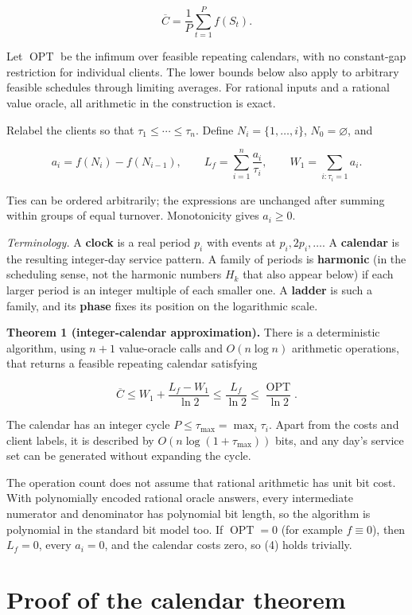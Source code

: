 \documentclass[
  british,
  11pt,
  a4paper,
]{article}
\begin{document}
\[
\overline C=\frac1P\sum_{t=1}^P f(S_t).
\]

Let \(\operatorname{OPT}\) be the infimum over feasible repeating
calendars, with no constant-gap restriction for individual clients. The
lower bounds below also apply to arbitrary feasible schedules through
limiting averages. For rational inputs and a rational value oracle, all
arithmetic in the construction is exact.

Relabel the clients so that \(\tau_1\le\cdots\le\tau_n\). Define
\(N_i=\{1,\ldots,i\}\), \(N_0=\varnothing\), and

\[
a_i=f(N_i)-f(N_{i-1}),\qquad
L_f=\sum_{i=1}^n\frac{a_i}{\tau_i},\qquad
W_1=\sum_{i:\tau_i=1}a_i. \tag{3}
\]

Ties can be ordered arbitrarily; the expressions are unchanged after
summing within groups of equal turnover. Monotonicity gives \(a_i\ge0\).

\emph{Terminology.} A \textbf{clock} is a real period \(p_i\) with
events at \(p_i,2p_i,\ldots\). A \textbf{calendar} is the resulting
integer-day service pattern. A family of periods is \textbf{harmonic}
(in the scheduling sense, not the harmonic numbers \(H_k\) that also
appear below) if each larger period is an integer multiple of each
smaller one. A \textbf{ladder} is such a family, and its \textbf{phase}
fixes its position on the logarithmic scale.

\textbf{Theorem 1 (integer-calendar approximation).} There is a
deterministic algorithm, using \(n+1\) value-oracle calls and
\(O(n\log n)\) arithmetic operations, that returns a feasible repeating
calendar satisfying

\[
\overline C\le W_1+\frac{L_f-W_1}{\ln2}
\le\frac{L_f}{\ln2}
\le\frac{\operatorname{OPT}}{\ln2}. \tag{4}
\]

The calendar has an integer cycle \(P\le\tau_{\max}=\max_i\tau_i\).
Apart from the costs and client labels, it is described by
\(O(n\log(1+\tau_{\max}))\) bits, and any day's service set can be
generated without expanding the cycle.

The operation count does not assume that rational arithmetic has unit
bit cost. With polynomially encoded rational oracle answers, every
intermediate numerator and denominator has polynomial bit length, so the
algorithm is polynomial in the standard bit model too. If
\(\operatorname{OPT}=0\) (for example \(f\equiv0\)), then \(L_f=0\),
every \(a_i=0\), and the calendar costs zero, so (4) holds trivially.

\section{Proof of the calendar
theorem}\label{proof-of-the-calendar-theorem}
\end{document}
